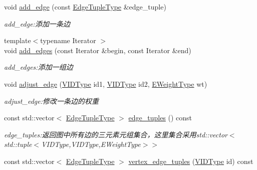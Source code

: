 \begin{DoxyCompactItemize}
void \hyperlink{struct_introduction_to_algorithm_1_1_graph_algorithm_1_1_graph_a12c0a31a2e46db24e87869bcbda58411}{add\+\_\+edge} (const \hyperlink{struct_introduction_to_algorithm_1_1_graph_algorithm_1_1_graph_ad8741e2431522370c7221c0d5633255a}{Edge\+Tuple\+Type} \&edge\+\_\+tuple)
\begin{DoxyCompactList}\small\item\em add\+\_\+edge\+:添加一条边 \end{DoxyCompactList}\item 
{\footnotesize template$<$typename Iterator $>$ }\\void \hyperlink{struct_introduction_to_algorithm_1_1_graph_algorithm_1_1_graph_a71ddba06bfe78c706945dbad6daa98d7}{add\+\_\+edges} (const Iterator \&begin, const Iterator \&end)
\begin{DoxyCompactList}\small\item\em add\+\_\+edges\+:添加一组边 \end{DoxyCompactList}\item 
void \hyperlink{struct_introduction_to_algorithm_1_1_graph_algorithm_1_1_graph_af536e4bcbd569a5f5dc8947682710421}{adjust\+\_\+edge} (\hyperlink{struct_introduction_to_algorithm_1_1_graph_algorithm_1_1_graph_a60819f2040f2ac261a680db30b0f4409}{V\+I\+D\+Type} id1, \hyperlink{struct_introduction_to_algorithm_1_1_graph_algorithm_1_1_graph_a60819f2040f2ac261a680db30b0f4409}{V\+I\+D\+Type} id2, \hyperlink{struct_introduction_to_algorithm_1_1_graph_algorithm_1_1_graph_ab398c44ce5ea13c66b38edfcbdd2cdc3}{E\+Weight\+Type} wt)
\begin{DoxyCompactList}\small\item\em adjust\+\_\+edge\+:修改一条边的权重 \end{DoxyCompactList}\item 
const std\+::vector$<$ \hyperlink{struct_introduction_to_algorithm_1_1_graph_algorithm_1_1_graph_ad8741e2431522370c7221c0d5633255a}{Edge\+Tuple\+Type} $>$ \hyperlink{struct_introduction_to_algorithm_1_1_graph_algorithm_1_1_graph_a64f9d2b81cbdc35158aa153125bd37c2}{edge\+\_\+tuples} () const 
\begin{DoxyCompactList}\small\item\em edge\+\_\+tuples\+:返回图中所有边的三元素元组集合，这里集合采用{\ttfamily std\+::vector$<$std\+::tuple$<$V\+I\+D\+Type,V\+I\+D\+Type,E\+Weight\+Type$>$$>$} \end{DoxyCompactList}\item 
const std\+::vector$<$ \hyperlink{struct_introduction_to_algorithm_1_1_graph_algorithm_1_1_graph_ad8741e2431522370c7221c0d5633255a}{Edge\+Tuple\+Type} $>$ \hyperlink{struct_introduction_to_algorithm_1_1_graph_algorithm_1_1_graph_af511dea0917622c4d444550e97ca70f0}{vertex\+\_\+edge\+\_\+tuples} (\hyperlink{struct_introduction_to_algorithm_1_1_graph_algorithm_1_1_graph_a60819f2040f2ac261a680db30b0f4409}{V\+I\+D\+Type} id) const 

\end{DoxyCompactItemize}
